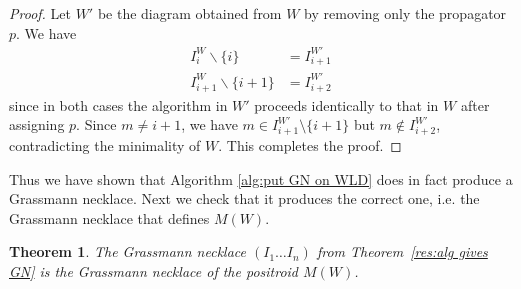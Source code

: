 \documentclass[11pt]{article}
\newtheorem{thm}{Theorem}[section]
\theoremstyle{remark}
\theoremstyle{definition}
\begin{document}
\begin{proof}
Let $W'$ be the diagram obtained from $W$ by removing only the propagator $p$.  We have
\begin{align*}
  I_i^{W} \backslash \{i\} & = I_{i+1}^{W'} \\
  I_{i+1}^{W} \backslash \{i+1\} & = I_{i+2}^{W'}
\end{align*}
since in both cases the algorithm in $W'$ proceeds identically to that in $W$ after assigning $p$. Since $m \neq i+1$, we have $m\in I_{i+1}^{W'}\setminus\{i+1\}$ but $m\not\in I_{i+2}^{W'}$, contradicting the minimality of $W$. This completes the proof.
\end{proof}

Thus we have shown that Algorithm \ref{alg:put GN on WLD} does in fact produce a Grassmann necklace. Next we check that it produces the correct one, i.e. the Grassmann necklace that defines $M(W)$. 
\begin{thm}\label{res alg gives correct GN} 
The Grassmann necklace $(I_1 \ldots I_n)$ from Theorem~\ref{res:alg gives GN} is the Grassmann necklace of the positroid $M(W)$.
\end{thm}
\end{document}
